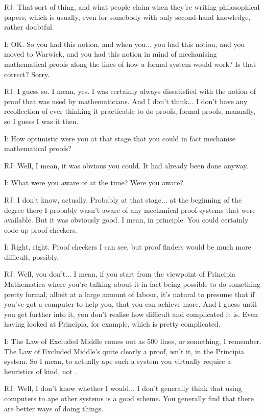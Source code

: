 \documentclass[10pt,titlepage]{book}
\begin{document}
RJ: That sort of thing, and what people claim when they're writing philosophical papers, which is usually, even for somebody with only second-hand knowledge, rather doubtful.

I: OK. So you had this notion, and when you... you had this notion, and you moved to Warwick, and you had this notion in mind of mechanising mathematical proofs along the lines of how a formal system would work? Is that correct? Sorry.

RJ: I guess so. I mean, yes. I was certainly always dissatisfied with the notion of proof that was used by mathematicians. And I don't think... I don't have any recollection of ever thinking it practicable to do proofs, formal proofs, manually, so I guess I was 	it then.

I: How optimistic were you at that stage that you could in fact mechanise mathematical proofs?

RJ: Well, I mean, it was obvious you could. It had already been done anyway.

I: What were you aware of at the time? Were you aware?

RJ: I don't know, actually. Probably at that stage... at the beginning of the degree there I probably wasn't aware of any mechanical proof systems that were available. But it was obviously good. I mean, in principle. You could certainly code up proof checkers.

I: Right, right. Proof checkers I can see, but proof finders would be much more difficult, possibly.

RJ: Well, you don't... I mean, if you start from the viewpoint of Principia Mathematica where you're talking about it in fact being possible to do something pretty formal, albeit at a large amount of labour, it's natural to presume that if you've got a computer to help you, that you can achieve more. And I guess until you get further into it, you don't realise how difficult and complicated it is. Even having looked at Principia, for example, which is pretty complicated.

I: The Law of Excluded Middle comes out as 500 lines, or something, I remember. The Law of Excluded Middle's quite clearly a proof, isn't it, in the Principia system. So I mean, to actually ape such a system you virtually require a heuristics of kind, not	.

RJ: Well, I don't know whether I would... I don't generally think that using computers to ape other systems is a good scheme. You generally find that there are better ways of doing things.
\end{document}

